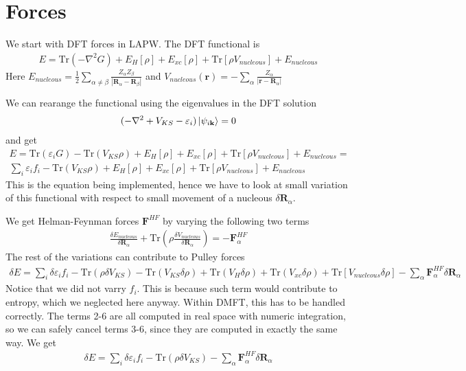 \documentclass[aps,prb,floatfix,epsfig,singlecolumn,showpacs,preprintnumbers]{revtex4}
\newcommand{\vR}{{\mathbf{R}}}
\newcommand{\vF}{{\mathbf{F}}}
\renewcommand{\vr}{{\mathbf{r}}}
\newcommand{\vk}{{\mathbf{k}}}
\newcommand{\Tr}{\mathrm{Tr}}
\begin{document}
\section{Forces}

We start with DFT forces in LAPW. The DFT functional is
\begin{eqnarray}
E = \Tr(-\nabla^2 G) + E_H[\rho]+E_{xc}[\rho]+\Tr[\rho  V_{nucleous}]+E_{nucleous}
\end{eqnarray}
Here $E_{nucleous}=\frac{1}{2} \sum_{\alpha\ne \beta}\frac{Z_\alpha
  Z_\beta}{|\vR_\alpha-\vR_\beta|}$ and $V_{nucleous}(\vr)=-\sum_\alpha \frac{Z_\alpha}{|\vr-\vR_\alpha|}$

We can rearange the functional using the eigenvalues in the DFT
solution
\begin{eqnarray}
(-\nabla^2+V_{KS}-\varepsilon_i)\ket{\psi_{i\vk}}=0
\end{eqnarray}
and get
\begin{eqnarray}
E = \Tr(\varepsilon_i G) - \Tr(V_{KS}\rho )+E_H[\rho]+E_{xc}[\rho]+\Tr[\rho  V_{nucleous}]+E_{nucleous}=\\
\sum_i \varepsilon_i f_i - \Tr(V_{KS}\rho )+E_H[\rho]+E_{xc}[\rho]+\Tr[\rho  V_{nucleous}]+E_{nucleous}
\end{eqnarray}
This is the equation being implemented, hence we have to look at small
variation of this functional with respect to small movement of a
nucleous $\delta \vR_\alpha$.

We get Helman-Feynman forces $\vF^{HF}$ by varying the following two
terms
\begin{eqnarray}
\frac{\delta E_{nucleous}}{\delta \vR_\alpha}+\Tr(\rho \frac{\delta V_{nucleous}}{\delta \vR_\alpha})=-\vF^{HF}_\alpha
\end{eqnarray}
The rest of the variations can contribute to Pulley forces
\begin{eqnarray}
\delta E=\sum_i \delta \varepsilon_i f_i - \Tr(\rho \delta V_{KS})-\Tr(V_{KS}\delta \rho )
+\Tr(V_H \delta\rho)+\Tr(V_{xc} \delta\rho)+\Tr[V_{nucleous}\delta\rho]-\sum_\alpha\vF^{HF}_\alpha\delta \vR_\alpha
\end{eqnarray}
Notice that we did not varry $f_i$. This is because such term would
contribute to entropy, which we neglected here anyway. Within DMFT,
this has to be handled correctly.
The terms 2-6 are all computed in real space with numeric integration,
so we can safely cancel terms 3-6, since they are computed in exactly the
same way. We get
\begin{eqnarray}
\delta E=\sum_i \delta \varepsilon_i f_i - \Tr(\rho \delta V_{KS})-\sum_\alpha\vF^{HF}_\alpha\delta \vR_\alpha
\label{Eq:forceL}
\end{eqnarray}
\end{document}
